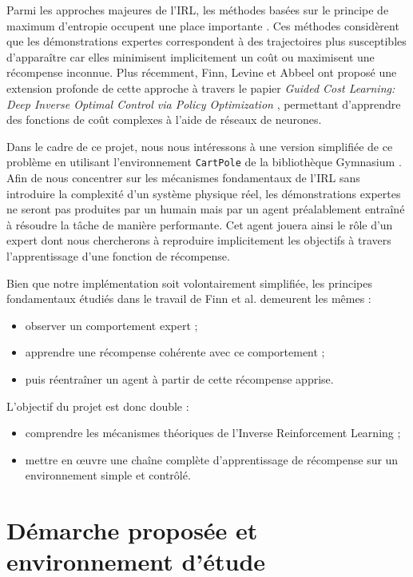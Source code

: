 \documentclass{article}
\begin{document}
Parmi les approches majeures de l’IRL, les méthodes basées sur le principe de maximum d’entropie occupent une place importante \cite{ziebart2008maximum, ziebart2010modeling}. Ces méthodes considèrent que les démonstrations expertes correspondent à des trajectoires plus susceptibles d’apparaître car elles minimisent implicitement un coût ou maximisent une récompense inconnue. Plus récemment, Finn, Levine et Abbeel ont proposé une extension profonde de cette approche à travers le papier \textit{Guided Cost Learning: Deep Inverse Optimal Control via Policy Optimization} \cite{finn2016guided}, permettant d’apprendre des fonctions de coût complexes à l’aide de réseaux de neurones.

Dans le cadre de ce projet, nous nous intéressons à une version simplifiée de ce problème en utilisant l’environnement \texttt{CartPole} de la bibliothèque Gymnasium \cite{gymnasium}. Afin de nous concentrer sur les mécanismes fondamentaux de l’IRL sans introduire la complexité d’un système physique réel, les démonstrations expertes ne seront pas produites par un humain mais par un agent préalablement entraîné à résoudre la tâche de manière performante. Cet agent jouera ainsi le rôle d’un expert dont nous chercherons à reproduire implicitement les objectifs à travers l’apprentissage d’une fonction de récompense.

Bien que notre implémentation soit volontairement simplifiée, les principes fondamentaux étudiés dans le travail de Finn et al. \cite{finn2016guided} demeurent les mêmes :
\begin{itemize}
    \item observer un comportement expert ;
    \item apprendre une récompense cohérente avec ce comportement ;
    \item puis réentraîner un agent à partir de cette récompense apprise.
\end{itemize}

L’objectif du projet est donc double :
\begin{itemize}
    \item comprendre les mécanismes théoriques de l’Inverse Reinforcement Learning ;
    \item mettre en œuvre une chaîne complète d’apprentissage de récompense sur un environnement simple et contrôlé.
\end{itemize}



\section{Démarche proposée et environnement d’étude}
\end{document}
